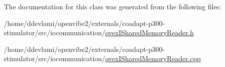 The documentation for this class was generated from the following files:\begin{DoxyCompactItemize}
\item 
/home/ddevlami/openvibe2/externals/coadapt-\/p300-\/stimulator/src/iocommunication/\hyperlink{ovexISharedMemoryReader_8h}{ovexISharedMemoryReader.h}\item 
/home/ddevlami/openvibe2/externals/coadapt-\/p300-\/stimulator/src/iocommunication/\hyperlink{ovexISharedMemoryReader_8cpp}{ovexISharedMemoryReader.cpp}\end{DoxyCompactItemize}
